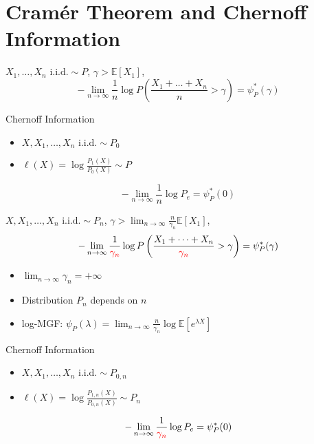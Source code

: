 \documentclass{beamer}
\begin{document}
\section{Cramér Theorem and Chernoff Information}
\begin{frame}
\begin{theorem}
$X_1, \dots, X_n  \textrm{ i.i.d.} \sim P$, $\gamma > \mathbb{E}[X_1]$, 
\begin{equation*}
-\lim_{n\to \infty}\frac{1}{n} \log P\left(\frac{X_1+ \dots + X_n}{n} > \gamma \right)
= \psi_P^*(\gamma)
\end{equation*}
\end{theorem}
Chernoff Information
\begin{itemize}
\item $X, X_1, \dots, X_n \textrm{ i.i.d.} \sim P_0$
\item $\ell(X) = \log\frac{P_1(X)}{P_0(X)} \sim P$
\end{itemize}
\begin{equation*}
-\lim_{n\to\infty} \frac{1}{n}\log P_e = \psi^*_P(0)
\end{equation*}
\end{frame}
\begin{frame}
\begin{theorem}
$X, X_1, \dots, X_n  \textrm{ i.i.d.} \sim P_n$, $\gamma > \lim_{n\to\infty} \frac{n}{\gamma_n}\mathbb{E}[X_1]$, 
\begin{equation*}
-\lim_{n\to \infty}\frac{1}{\textcolor{red}{\gamma_n}} \log P\left(\frac{X_1+ \dots + X_n}{\textcolor{red}{\gamma_n}} > \gamma \right)
= \psi_P^*(\gamma)
\end{equation*}
\begin{itemize}
\item $\lim_{n\to\infty} \gamma_n = +\infty$
\item Distribution $P_n$ depends on $n$
\item log-MGF: $\psi_P(\lambda)=\lim_{n\to\infty} \frac{n}{\gamma_n} \log \mathbb{E}[e^{\lambda X}]$
\end{itemize}
\end{theorem}
Chernoff Information
\begin{itemize}
\item $X, X_1, \dots, X_n \textrm{ i.i.d.} \sim P_{0,n}$
\item $\ell(X) = \log\frac{P_{1,n}(X)}{P_{0,n}(X)} \sim P_n$
\end{itemize}
\begin{equation*}
-\lim_{n\to\infty} \frac{1}{\textcolor{red}{\gamma_n}}\log P_e = \psi^*_P(0)
\end{equation*}
\end{frame}
\end{document}
